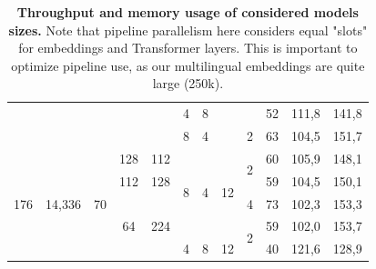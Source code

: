 \documentclass[11pt]{article}
\begin{document}
\begin{table}[h]
\begin{center}
\begin{small}
{\begin{tabular}{@{}cccccccccccc@{}}
                                  &                         &                      &                      &                       & 4                   & 8                  &                     &                    & 52                 & 111,8                & 141,8            \\
                                  &                         &                      &                      &                       & 8                   & 4                  &                     & 2                  & 63                 & 104,5                & 151,7            \\\midrule
\multirow{5}{*}{176}              & \multirow{5}{*}{14,336} & \multirow{5}{*}{70}  & 128                  & 112                   & \multirow{4}{*}{8}  & \multirow{4}{*}{4} & \multirow{4}{*}{12} & \multirow{2}{*}{2} & 60                 & 105,9                & 148,1            \\
                                  &                         &                      & 112                  & 128                   &                     &                    &                     &                    & 59                 & 104,5                & 150,1            \\
                                  &                         &                      & \multirow{3}{*}{64}  & \multirow{3}{*}{224}  &                     &                    &                     & 4                  & 73                 & 102,3                & 153,3            \\
                                  &                         &                      &                      &                       &                     &                    &                     & \multirow{2}{*}{2} & 59                 & 102,0                & 153,7            \\
                                  &                         &                      &                      &                       & 4                   & 8                  & 12                  &                    & 40                 & 121,6                & 128,9            \\ \bottomrule

\end{tabular}}
\end{small}
\end{center}
\caption{\textbf{Throughput and memory usage of considered models sizes.} Note that pipeline parallelism here considers equal "slots" for embeddings and Transformer layers. This is important to optimize pipeline use, as our multilingual embeddings are quite large (250k).}
\label{tab:sup_throughput}
\end{table}
\end{document}
